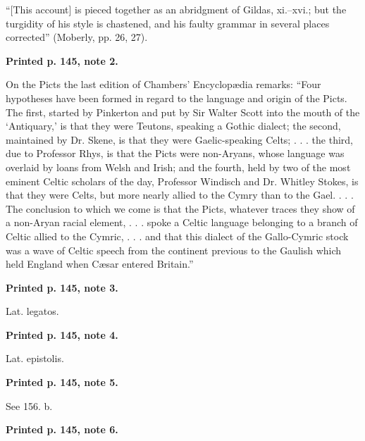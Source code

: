 “[This account] is pieced together as an abridgment of Gildas, xi.–xvi.; but the turgidity of his style is chastened, and his faulty grammar in several places corrected” (Moberly, pp. 26, 27).

\textbf{Printed p. 145, note 2.}

On the Picts the last edition of Chambers’ Encyclopædia remarks: “Four hypotheses have been formed in regard to the language and origin of the Picts. The first, started by Pinkerton and put by Sir Walter Scott into the mouth of the ‘Antiquary,’ is that they were Teutons, speaking a Gothic dialect; the second, maintained by Dr. Skene, is that they were Gaelic-speaking Celts; . . . the third, due to Professor Rhys, is that the Picts were non-Aryans, whose language was overlaid by loans from Welsh and Irish; and the fourth, held by two of the most eminent Celtic scholars of the day, Professor Windisch and Dr. Whitley Stokes, is that they were Celts, but more nearly allied to the Cymry than to the Gael. . . . The conclusion to which we come is that the Picts, whatever traces they show of a non-Aryan racial element, . . . spoke a Celtic language belonging to a branch of Celtic allied to the Cymric, . . . and that this dialect of the Gallo-Cymric stock was a wave of Celtic speech from the continent previous to the Gaulish which held England when Cæsar entered Britain.”

\textbf{Printed p. 145, note 3.}

Lat. legatos.

\textbf{Printed p. 145, note 4.}

Lat. epistolis.

\textbf{Printed p. 145, note 5.}

See 156. b.

\textbf{Printed p. 145, note 6.}

